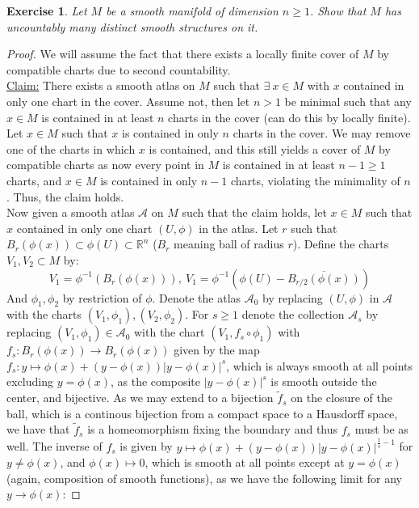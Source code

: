 \documentclass{article}
\newcommand{\bb}[1]{\mathbb{#1}}
\newtheorem{exercise}{Exercise}
\begin{document}
\begin{exercise}
  Let $M$ be a smooth manifold of dimension $n \geq 1$. Show that $M$ has uncountably many distinct smooth structures on it.
\end{exercise}
\begin{proof}
  We will assume the fact that there exists a locally finite cover of $M$ by compatible charts due to second countability. \\
  \underline{Claim:} There exists a smooth atlas on $M$ such that $\exists \ x\in M$ with $x$ contained in only one chart in the cover. Assume not, then let $n>1$ be minimal such that any $x \in M$ is contained in at least $n$ charts in the cover (can do this by locally finite). Let $x \in M$ such that $x$ is contained in only $n$ charts in the cover. We may remove one of the charts in which $x$ is contained, and this still yields a cover of $M$ by compatible charts as now every point in $M$ is contained in at least $n-1 \geq 1$ charts, and $x \in M$ is contained in only $n-1$ charts, violating the minimality of $n$. Thus, the claim holds. \\
  Now given a smooth atlas $\mathcal{A}$ on $M$ such that the claim holds, let $x \in M$ such that $x$ contained in only one chart $(U,\phi)$ in the atlas. Let $r$ such that $B_{r}(\phi(x)) \subset \phi(U) \subset \bb{R}^{n}$ ($B_{r}$ meaning ball of radius $r$). Define the charts $V_{1}, V_{2} \subset M$ by:
  \[
    V_{1} = \phi^{-1}\left(B_{r}(\phi(x))\right), \ V_{1} = \phi^{-1}\left(\phi(U) - \overline{B_{r/2}(\phi(x))}\right)
    \]
    And $\phi_{1},\phi_{2}$ by restriction of $\phi$. Denote the atlas $\mathcal{A}_{0}$ by replacing $(U,\phi)$ in $\mathcal{A}$ with the charts $(V_{1},\phi_{1}), (V_{2},\phi_{2})$. For $s \geq 1$ denote the collection $\mathcal{A}_{s}$ by replacing $(V_{1},\phi_{1}) \in \mathcal{A}_{0}$ with the chart $(V_{1}, f_{s}\circ \phi_{1})$ with $f_{s}: B_{r}(\phi(x)) \to B_{r}(\phi(x))$ given by the map $f_{s}: y \mapsto \phi(x) + (y-\phi(x))|y-\phi(x)|^{s}$, which is always smooth at all points excluding $y = \phi(x)$, as the composite $|y-\phi(x)|^{s}$ is smooth outside the center, and bijective. As we may extend to a bijection $\widetilde f_{s}$ on the closure of the ball, which is a continous bijection from a compact space to a Hausdorff space, we have that $\widetilde f_{s}$ is a homeomorphism fixing the boundary and thus $f_{s}$ must be as well. The inverse of $f_{s}$ is given by $y \mapsto \phi(x) + (y - \phi(x))|y - \phi(x)|^{\frac{1}{s}-1}$ for $y \neq \phi(x)$, and $\phi(x) \mapsto 0$, which is smooth at all points except at $y = \phi(x)$ (again, composition of smooth functions), as we have the following limit for any $y \to \phi(x)$:

\end{proof}
\end{document}
